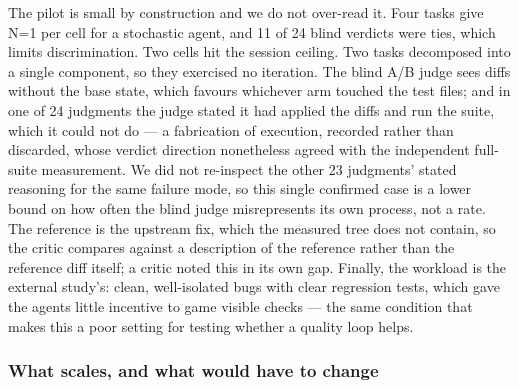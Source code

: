 \documentclass[11pt]{article}
\begin{document}
The pilot is small by construction and we do not over-read it. Four tasks give
N=1 per cell for a stochastic agent, and 11 of 24 blind verdicts were ties,
which limits discrimination. Two cells hit the session ceiling. Two tasks
decomposed into a single component, so they exercised no iteration. The blind
A/B judge sees diffs without the base state, which favours whichever arm
touched the test files; and in one of 24 judgments the judge stated it had
applied the diffs and run the suite, which it could not do --- a fabrication of
execution, recorded rather than discarded, whose verdict direction nonetheless
agreed with the independent full-suite measurement. We did not re-inspect the
other 23 judgments' stated reasoning for the same failure mode, so this
single confirmed case is a lower bound on how often the blind judge
misrepresents its own process, not a rate. The reference is the
upstream fix, which the measured tree does not contain, so the critic compares
against a description of the reference rather than the reference diff itself; a
critic noted this in its own gap. Finally, the workload is the external study's:
clean, well-isolated bugs with clear regression tests, which gave the agents
little incentive to game visible checks --- the same condition that makes this
a poor setting for testing whether a quality loop helps.

\subsubsection{What scales, and what would have to change}
\end{document}
